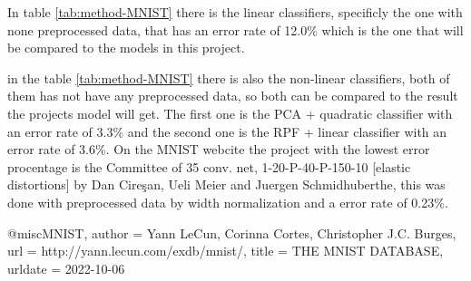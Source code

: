In table \ref{tab:method-MNIST} there is the linear classifiers, specificly the one with none preprocessed data, that has an error rate of 12.0\% which is the one that will be compared to the models in this project. 

in the table \ref{tab:method-MNIST} there is also the non-linear classifiers, both of them has not have any preprocessed data, so both can be compared to the result the projects model will get. The first one is the PCA + quadratic classifier with an error rate of 3.3\% and the second one is the RPF + linear classifier with an error rate of 3.6\%. 
On the MNIST webcite \cite{MNIST} the project with the lowest error procentage is the Committee of 35 conv. net, 1-20-P-40-P-150-10 [elastic distortions] by Dan Cireşan, Ueli Meier and Juergen Schmidhuberthe, this was done with preprocessed data by width normalization and a error rate of 0.23\%.








@misc{MNIST,
  author = {Yann LeCun, Corinna Cortes, Christopher J.C. Burges},
  url          = {http://yann.lecun.com/exdb/mnist/},
  title        = {THE MNIST DATABASE},
  urldate      = {2022-10-06}
}
